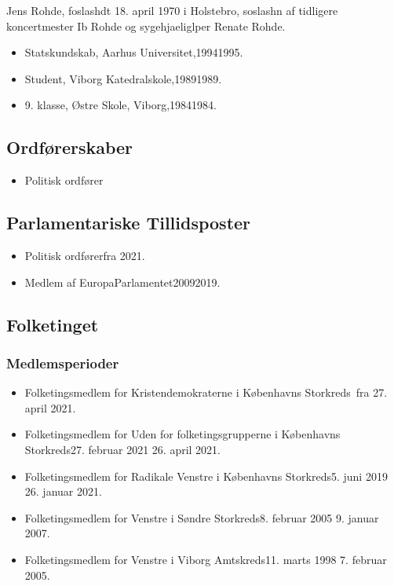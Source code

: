 \documentclass[11pt, a4paper]{awesome-cv}
\begin{document}
\makecvheader[R]
\makelettertitle
\begin{cvletter}
Jens Rohde, foslashdt 18. april 1970 i Holstebro, soslashn af tidligere koncertmester Ib Rohde og sygehjaeliglper Renate Rohde.

\begin{itemize}
\item Statskundskab, Aarhus Universitet,19941995.
\item Student, Viborg Katedralskole,19891989.
\item 9. klasse, Østre Skole, Viborg,19841984.
\end{itemize}
\subsection*{Ordførerskaber}
\begin{itemize}
\item Politisk ordfører
\end{itemize}
\subsection*{Parlamentariske Tillidsposter}
\begin{itemize}
\item Politisk ordførerfra 2021.
\item Medlem af EuropaParlamentet20092019.
\end{itemize}
\subsection*{Folketinget}
\subsubsection*{Medlemsperioder}
\begin{itemize}
\item Folketingsmedlem for Kristendemokraterne i Københavns Storkreds fra 27. april 2021.
\item Folketingsmedlem for Uden for folketingsgrupperne i Københavns Storkreds27. februar 2021  26. april 2021.
\item Folketingsmedlem for Radikale Venstre i Københavns Storkreds5. juni 2019  26. januar 2021.
\item Folketingsmedlem for Venstre i Søndre Storkreds8. februar 2005  9. januar 2007.
\item Folketingsmedlem for Venstre i Viborg Amtskreds11. marts 1998  7. februar 2005.
\end{itemize}

\end{cvletter}
\end{document}
